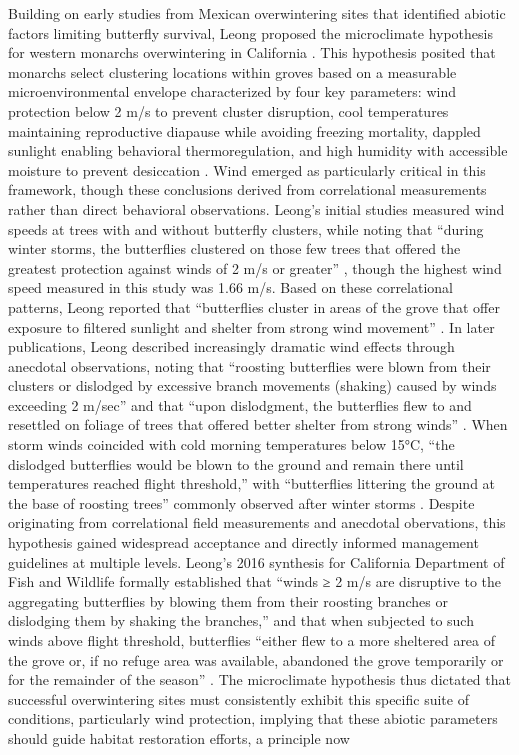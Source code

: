 Building on early studies from Mexican overwintering sites that identified abiotic factors limiting butterfly survival, Leong proposed the microclimate hypothesis for western monarchs overwintering in California \citep{leongMicroenvironmentalFactorsAssociated1990}. This hypothesis posited that monarchs select clustering locations within groves based on a measurable microenvironmental envelope characterized by four key parameters: wind protection below 2 m/s to prevent cluster disruption, cool temperatures maintaining reproductive diapause while avoiding freezing mortality, dappled sunlight enabling behavioral thermoregulation, and high humidity with accessible moisture to prevent desiccation \citep{leongMicroenvironmentalFactorsAssociated1990,leongUseMultivariateAnalyses1991}. Wind emerged as particularly critical in this framework, though these conclusions derived from correlational measurements rather than direct behavioral observations. Leong's initial studies measured wind speeds at trees with and without butterfly clusters, while noting that ``during winter storms, the butterflies clustered on those few trees that offered the greatest protection against winds of 2 m/s or greater'' \citep{leongMicroenvironmentalFactorsAssociated1990}, though the highest wind speed measured in this study was 1.66 m/s. Based on these correlational patterns, Leong reported that ``butterflies cluster in areas of the grove that offer exposure to filtered sunlight and shelter from strong wind movement'' \citep{leongUseMultivariateAnalyses1991}. In later publications, Leong described increasingly dramatic wind effects through anecdotal observations, noting that ``roosting butterflies were blown from their clusters or dislodged by excessive branch movements (shaking) caused by winds exceeding 2 m/sec'' and that ``upon dislodgment, the butterflies flew to and resettled on foliage of trees that offered better shelter from strong winds'' \citep{leongRestorationOverwinteringGrove1999}. When storm winds coincided with cold morning temperatures below 15°C, ``the dislodged butterflies would be blown to the ground and remain there until temperatures reached flight threshold,'' with ``butterflies littering the ground at the base of roosting trees'' commonly observed after winter storms \citep{leongRestorationOverwinteringGrove1999}. Despite originating from correlational field measurements and anecdotal obervations, this hypothesis gained widespread acceptance and directly informed management guidelines at multiple levels. Leong's 2016 synthesis for California Department of Fish and Wildlife formally established that ``winds ≥ 2 m/s are disruptive to the aggregating butterflies by blowing them from their roosting branches or dislodging them by shaking the branches,'' and that when subjected to such winds above flight threshold, butterflies ``either flew to a more sheltered area of the grove or, if no refuge area was available, abandoned the grove temporarily or for the remainder of the season'' \citep{leongEvaluationManagementCalifornia2016}. The microclimate hypothesis thus dictated that successful overwintering sites must consistently exhibit this specific suite of conditions, particularly wind protection, implying that these abiotic parameters should guide habitat restoration efforts, a principle now 